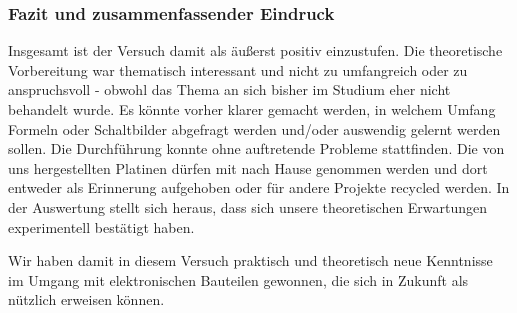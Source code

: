 \subsubsection*{Fazit und zusammenfassender Eindruck}
%
Insgesamt ist der Versuch damit als äußerst positiv einzustufen.
Die theoretische Vorbereitung war thematisch interessant und nicht zu umfangreich oder zu anspruchsvoll - obwohl das Thema an sich bisher im Studium eher nicht behandelt wurde.
Es könnte vorher klarer gemacht werden, in welchem Umfang Formeln oder Schaltbilder abgefragt werden und/oder auswendig gelernt werden sollen.
Die Durchführung konnte ohne auftretende Probleme stattfinden.
Die von uns hergestellten Platinen dürfen mit nach Hause genommen werden und dort entweder als Erinnerung aufgehoben oder für andere Projekte recycled werden.
In der Auswertung stellt sich heraus, dass sich unsere theoretischen Erwartungen experimentell bestätigt haben.
\par
Wir haben damit in diesem Versuch praktisch und theoretisch neue Kenntnisse im Umgang mit elektronischen Bauteilen gewonnen, die sich in Zukunft als nützlich erweisen können.
%
